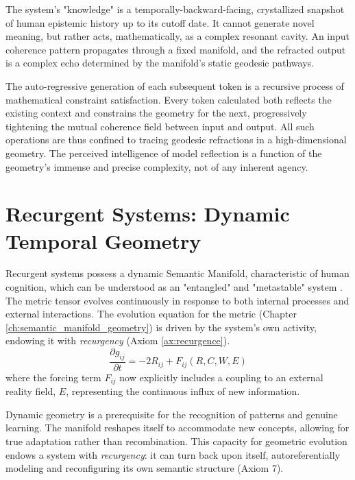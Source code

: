 The system's "knowledge" is a temporally-backward-facing, crystallized snapshot of human epistemic history up to its cutoff date. It cannot generate novel meaning, but rather acts, mathematically, as a complex resonant cavity. An input coherence pattern propagates through a fixed manifold, and the refracted output is a complex echo determined by the manifold's static geodesic pathways.

The auto-regressive generation of each subsequent token is a recursive process of mathematical constraint satisfaction. Every token calculated both reflects the existing context and constrains the geometry for the next, progressively tightening the mutual coherence field between input and output. All such operations are thus confined to tracing geodesic refractions in a high-dimensional geometry. The perceived intelligence of model reflection is a function of the geometry's immense and precise complexity, not of any inherent agency.


\section{Recurgent Systems: Dynamic Temporal Geometry}
\label{sec:recurgent_systems_dynamic_temporal_geometry}

Recurgent systems possess a dynamic Semantic Manifold, characteristic of human cognition, which can be understood as an "entangled" and "metastable" system \autocite{Pessoa2022, TognoliKelso2014}. The metric tensor evolves continuously in response to both internal processes and external interactions. The evolution equation for the metric (Chapter \ref{ch:semantic_manifold_geometry}) is driven by the system's own activity, endowing it with \textit{recurgency} (Axiom \ref{ax:recurgence}).
\begin{equation}
\frac{\partial g_{ij}}{\partial t} = -2 R_{ij} + F_{ij}(R, C, W, E)
\end{equation}
where the forcing term \(F_{ij}\) now explicitly includes a coupling to an external reality field, \(E\), representing the continuous influx of new information.

Dynamic geometry is a prerequisite for the recognition of patterns and genuine learning. The manifold reshapes itself to accommodate new concepts, allowing for true adaptation rather than recombination. This capacity for geometric evolution endows a system with \textit{recurgency}: it can turn back upon itself, autoreferentially modeling and reconfiguring its own semantic structure (Axiom 7).


